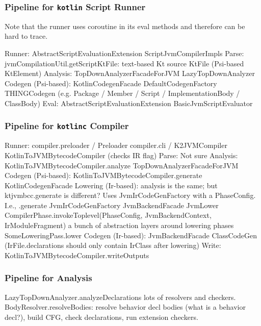 \documentclass{article}
\begin{document}
\subsubsection{Pipeline for \texttt{kotlin} Script Runner}
Note that the runner uses coroutine in its eval methods and therefore can be hard to trace.

Runner: AbstractScriptEvaluationExtension \textSafeTo ScriptJvmCompilerImpls
Parse: jvmCompilationUtil.getScriptKtFile: text-based Kt source \textSafeTo KtFile (Psi-based KtElement)
Analysis: TopDownAnalyzerFacadeForJVM \textSafeTo LazyTopDownAnalyzer
Codegen (Psi-based): KotlinCodegenFacade \textSafeTo DefaultCodegenFactory \textSafeTo THINGCodegen (e.g. Package / Member / Script / ImplementationBody / ClassBody)
Eval: AbstractScriptEvaluationExtension \textSafeTo BasicJvmScriptEvaluator

\subsubsection{Pipeline for \texttt{kotlinc} Compiler}

 Runner: compiler.preloader / Preloader \textSafeTo compiler.cli / K2JVMCompiler \textSafeTo KotlinToJVMBytecodeCompiler (checks IR flag)
Parse: Not sure
Analysis: KotlinToJVMBytecodeCompiler.analyze \textSafeTo TopDownAnalyzerFacadeForJVM
Codegen (Psi-based): KotlinToJVMBytecodeCompiler.generate \textSafeTo KotlinCodegenFacade
Lowering (Ir-based): analysis is the same; but ktjvmbcc.generate is different? Uses JvmIrCodeGenFactory with a PhaseConfig. I.e., .generate \textSafeTo JvmIrCodeGenFactory \textSafeTo JvmBackendFacade \textSafeTo JvmLower \textSafeTo CompilerPhase.invokeToplevel(PhaseConfig, JvmBackendContext, IrModuleFragment) \textSafeTo a bunch of abstraction layers around lowering phases \textSafeTo SomeLoweringPass.lower
Codegen (Ir-based): JvmBackendFacade \textSafeTo ClassCodeGen (IrFile.declarations should only contain IrClass after lowering)
Write: KotlinToJVMBytecodeCompiler.writeOutputs

\subsubsection{Pipeline for Analysis}

LazyTopDownAnalyzer.analyzeDeclarations \textSafeTo lots of resolvers and checkers.
BodyResolver.resolveBodies: resolve behavior decl bodies (what is a behavior decl?), build CFG, check declarations, run extension checkers.
\end{document}
